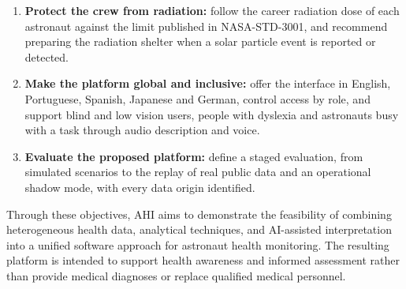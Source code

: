 \begin{enumerate}
\item \textbf{Protect the crew from radiation:} follow the career radiation dose of each astronaut against the limit published in NASA-STD-3001, and recommend preparing the radiation shelter when a solar particle event is reported or detected.

\item \textbf{Make the platform global and inclusive:} offer the interface in English, Portuguese, Spanish, Japanese and German, control access by role, and support blind and low vision users, people with dyslexia and astronauts busy with a task through audio description and voice.

\item \textbf{Evaluate the proposed platform:} define a staged evaluation, from simulated scenarios to the replay of real public data and an operational shadow mode, with every data origin identified.

\end{enumerate}

Through these objectives, AHI aims to demonstrate the feasibility of combining heterogeneous health data, analytical techniques, and AI-assisted interpretation into a unified software approach for astronaut health monitoring. The resulting platform is intended to support health awareness and informed assessment rather than provide medical diagnoses or replace qualified medical personnel.
